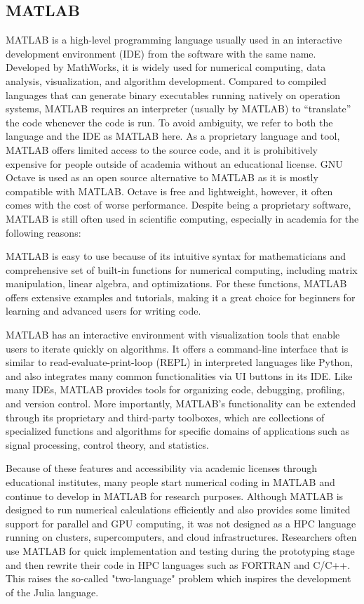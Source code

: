 \subsection{MATLAB}
MATLAB is a high-level programming language usually used in an interactive development environment (IDE) from the software with the same name.
Developed by MathWorks, it is widely used for numerical computing, data analysis, visualization, and algorithm development.
Compared to compiled languages that can generate binary executables running natively on operation systems, MATLAB requires an interpreter (usually by MATLAB) to ``translate'' the code whenever the code is run.
To avoid ambiguity, we refer to both the language and the IDE as MATLAB here.
As a proprietary language and tool, MATLAB offers limited access to the source code, and it is prohibitively expensive for people outside of academia without an educational license.
GNU Octave is used as an open source alternative to MATLAB as it is mostly compatible with MATLAB. Octave is free and lightweight, however, it often comes with the cost of worse performance.
Despite being a proprietary software, MATLAB is still often used in scientific computing, especially in academia for the following reasons:

MATLAB is easy to use because of its intuitive syntax for mathematicians and comprehensive set of built-in functions for numerical computing, including matrix manipulation, linear algebra, and optimizations. For these functions, MATLAB offers extensive examples and tutorials, making it a great choice for beginners for learning and advanced users for writing code.

MATLAB has an interactive environment with visualization tools that enable users to iterate quickly on algorithms. It offers a command-line interface that is similar to read-evaluate-print-loop (REPL) in interpreted languages like Python, and also integrates many common functionalities via UI buttons in its IDE.
Like many IDEs, MATLAB provides tools for organizing code, debugging, profiling, and version control.
More importantly, MATLAB's functionality can be extended through its proprietary and third-party toolboxes, which are collections of specialized functions and algorithms for specific domains of applications such as signal processing, control theory, and statistics.

Because of these features and accessibility via academic licenses through educational institutes, many people start numerical coding in MATLAB and continue to develop in MATLAB for research purposes. 
Although MATLAB is designed to run numerical calculations efficiently and also provides some limited support for parallel and GPU computing, it was not designed as a HPC language running on clusters, supercomputers, and cloud infrastructures. 
Researchers often use MATLAB for quick implementation and testing during the prototyping stage and then rewrite their code in HPC languages such as FORTRAN and C/C++. 
This raises the so-called "two-language" problem which inspires the development of the Julia language.


